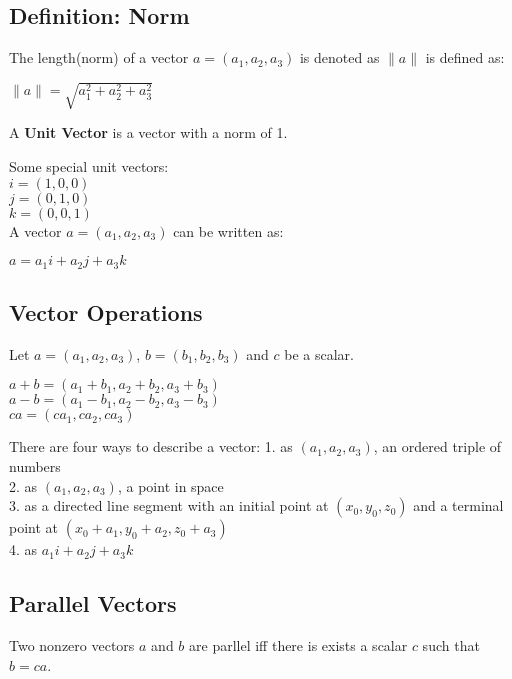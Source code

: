 \documentclass{article} %
\begin{document}
    \subsection*{Definition: Norm}
    The length(norm) of a vector $a = (a_1,a_2,a_3)$ is denoted as $\|a\|$ is defined as:
    \begin{center}
        $\|a\|=\sqrt{a^2_1+a^2_2+a^2_3}$
        
    \end{center}
    A \textbf{Unit Vector} is a vector with a norm of 1.

    Some special unit vectors:\\
    $i = (1,0,0)$\\
    $j = (0,1,0)$\\
    $k = (0,0,1)$\\
    A vector $a=(a_1,a_2,a_3)$ can be written as:
    \begin{center}
        $a = a_1i+a_2j+a_3k$
        
    \end{center}


    \subsection*{Vector Operations}
    Let $a = (a_1,a_2,a_3)$, $b = (b_1,b_2,b_3)$ and $c$ be a scalar.

    \begin{center}
        $a+b = (a_1+b_1,a_2+b_2,a_3+b_3)$\\
        $a-b = (a_1-b_1,a_2-b_2,a_3-b_3)$\\
        $ca=(ca_1,ca_2,ca_3)$
        
    \end{center}
    
    There are four ways to describe a vector:
    1. as $(a_1,a_2,a_3)$, an ordered triple of numbers\\
    2. as $(a_1,a_2,a_3)$, a point in space\\
    3. as a directed line segment with an initial point at $(x_0,y_0,z_0)$ and a terminal point at $(x_0+a_1,y_0+a_2,z_0+a_3)$\\
    4. as $a_1i+a_2j+a_3k$

    \subsection*{Parallel Vectors}
    Two nonzero vectors $a$ and $b$ are parllel iff there is exists a scalar $c$ such that
    $b = ca$.\\
\end{document}
